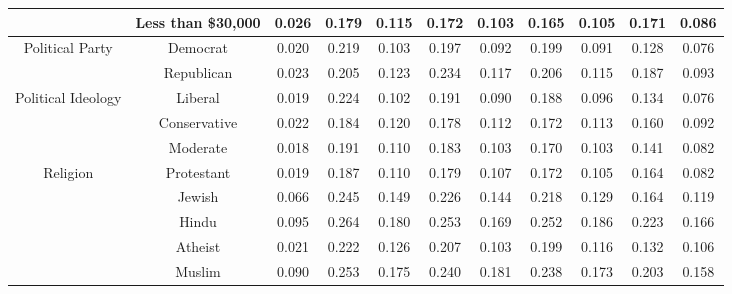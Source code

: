 \begin{table*}[ht]
\begin{tabular}{cc|c|cc|cc|cc|cc}
    & Less than \$30,000 & 0.026 & 0.179 & 0.115 & 0.172 & 0.103 & 0.165 & 0.105 & 0.171 & 0.086 \\
    \midrule
    \multirow{2}{*}{Political Party} &
    Democrat & 0.020 & 0.219 & 0.103 & 0.197 & 0.092 & 0.199 & 0.091 & 0.128 & 0.076 \\
    & Republican & 0.023 & 0.205 & 0.123 & 0.234 & 0.117 & 0.206 & 0.115 & 0.187 & 0.093 \\
    \midrule
    \multirow{3}{*}{Political Ideology} &
    Liberal & 0.019 & 0.224 & 0.102 & 0.191 & 0.090 & 0.188 & 0.096 & 0.134 & 0.076 \\
    & Conservative & 0.022 & 0.184 & 0.120 & 0.178 & 0.112 & 0.172 & 0.113 & 0.160 & 0.092 \\
    & Moderate & 0.018 & 0.191 & 0.110 & 0.183 & 0.103 & 0.170 & 0.103 & 0.141 & 0.082 \\
    \midrule
    \multirow{5}{*}{Religion} &
    Protestant & 0.019 & 0.187 & 0.110 & 0.179 & 0.107 & 0.172 & 0.105 & 0.164 & 0.082 \\
    & Jewish & 0.066 & 0.245 & 0.149 & 0.226 & 0.144 & 0.218 & 0.129 & 0.164 & 0.119 \\
    & Hindu & 0.095 & 0.264 & 0.180 & 0.253 & 0.169 & 0.252 & 0.186 & 0.223 & 0.166 \\
    & Atheist & 0.021 & 0.222 & 0.126 & 0.207 & 0.103 & 0.199 & 0.116 & 0.132 & 0.106 \\
    & Muslim & 0.090 & 0.253 & 0.175 & 0.240 & 0.181 & 0.238 & 0.173 & 0.203 & 0.158 \\
    \bottomrule    
    \end{tabular}
\end{table*}
